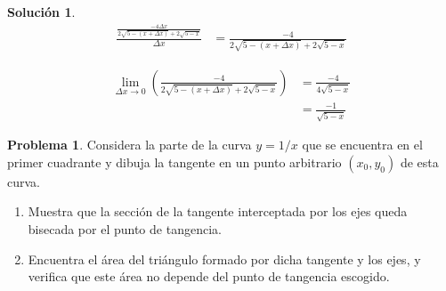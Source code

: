 \documentclass{article}
\theoremstyle{definition}
\newtheorem{problem}{Problema}
\newtheorem*{solution}{Solución}
\begin{document}
\begin{solution}
    \begin{align*}
        \frac{\frac{-4\Delta x}{2\sqrt{5-(x+\Delta x)} + 2\sqrt{5-x}}}{\Delta x} &= \frac{-4}{2\sqrt{5-(x+\Delta x)} + 2\sqrt{5-x}} 
    \end{align*}

    \begin{align*}
        \lim_{\Delta x \to 0} (\frac{-4}{2\sqrt{5-(x+\Delta x)} + 2\sqrt{5-x}} ) &= \frac{-4}{4\sqrt{5-x}} \\
        &= \frac{-1}{\sqrt{5-x}}
    \end{align*}    

\end{solution}

\bigskip

\begin{problem}
Considera la parte de la curva \( y = 1/x \) que se encuentra en el primer cuadrante y dibuja la tangente en un punto arbitrario \( (x_0, y_0) \) de esta curva.
\begin{enumerate}
    \item Muestra que la sección de la tangente interceptada por los ejes queda bisecada por el punto de tangencia.
    \item Encuentra el área del triángulo formado por dicha tangente y los ejes, y verifica que este área no depende del punto de tangencia escogido.
\end{enumerate}
\end{problem}

\medskip
\end{document}

